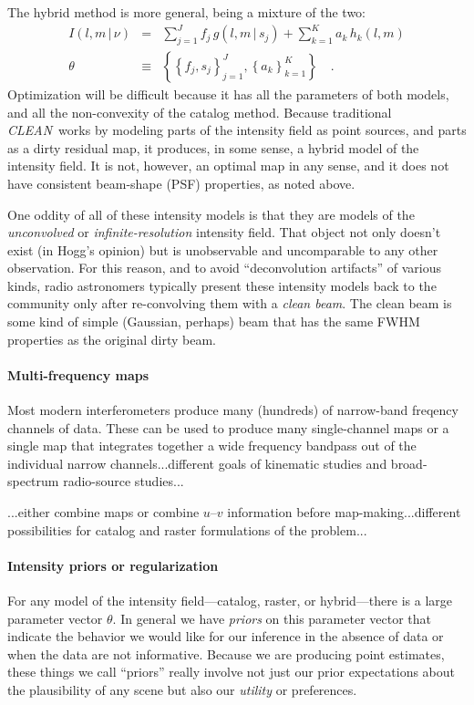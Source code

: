 \documentclass[12pt]{article}
\newcommand{\project}[1]{\textsl{#1}}
\newcommand{\CLEAN}{\project{CLEAN}}
\newcommand{\set}[1]{\left\{{#1}\right\}}
\newcommand{\given}{\,|\,}
\begin{document}
The hybrid method is more general, being a mixture of the two:
\begin{eqnarray}
I(l,m\given\nu) &=& \sum_{j=1}^J f_j\,g(l,m\given s_j)
                  + \sum_{k=1}^K a_k\,h_k(l,m)
\\
\theta &\equiv& \set{\set{f_j, s_j}_{j=1}^J, \set{a_k}_{k=1}^K}
\quad.
\end{eqnarray}
Optimization will be difficult because it has all the parameters of
both models, and all the non-convexity of the catalog method.  Because
traditional \CLEAN\ works by modeling parts of the intensity field as
point sources, and parts as a dirty residual map, it produces, in some
sense, a hybrid model of the intensity field.  It is not, however, an
optimal map in any sense, and it does not have consistent beam-shape
(PSF) properties, as noted above.

One oddity of all of these intensity models is that they are models of
the \emph{unconvolved} or \emph{infinite-resolution} intensity field.
That object not only doesn't exist (in Hogg's opinion) but is
unobservable and uncomparable to any other observation.  For this
reason, and to avoid ``deconvolution artifacts'' of various kinds,
radio astronomers typically present these intensity models back to the
community only after re-convolving them with a \emph{clean beam}.  The
clean beam is some kind of simple (Gaussian, perhaps) beam that has
the same FWHM properties as the original dirty beam.

\paragraph{Multi-frequency maps}

Most modern interferometers produce many (hundreds) of narrow-band
freqency channels of data.  These can be used to produce many
single-channel maps or a single map that integrates together a wide
frequency bandpass out of the individual narrow channels...different
goals of kinematic studies and broad-spectrum radio-source studies...

...either combine maps or combine $u$--$v$ information before
map-making...different possibilities for catalog and raster
formulations of the problem...

\paragraph{Intensity priors or regularization}

For any model of the intensity field---catalog, raster, or
hybrid---there is a large parameter vector $\theta$.  In general we
have \emph{priors} on this parameter vector that indicate the behavior
we would like for our inference in the absence of data or when the
data are not informative.  Because we are producing point estimates,
these things we call ``priors'' really involve not just our prior
expectations about the plausibility of any scene but also our
\emph{utility} or preferences.
\end{document}
